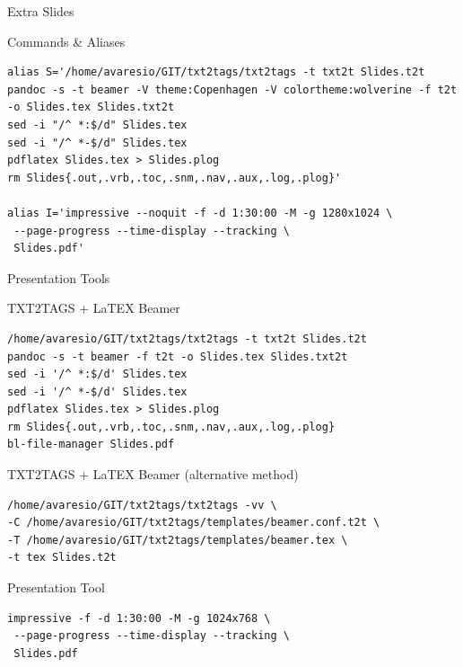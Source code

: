 \documentclass[ignorenonframetext,]{beamer}
\begin{document}
\begin{frame}[fragile]{Extra Slides}

\begin{block}{Commands \& Aliases}

\begin{verbatim}
alias S='/home/avaresio/GIT/txt2tags/txt2tags -t txt2t Slides.t2t
pandoc -s -t beamer -V theme:Copenhagen -V colortheme:wolverine -f t2t -o Slides.tex Slides.txt2t
sed -i "/^ *:$/d" Slides.tex
sed -i "/^ *-$/d" Slides.tex
pdflatex Slides.tex > Slides.plog
rm Slides{.out,.vrb,.toc,.snm,.nav,.aux,.log,.plog}'

alias I='impressive --noquit -f -d 1:30:00 -M -g 1280x1024 \
 --page-progress --time-display --tracking \
 Slides.pdf'
\end{verbatim}

\end{block}

\end{frame}

\begin{frame}[fragile]{Presentation Tools}

\begin{block}{TXT2TAGS + LaTEX Beamer}

\begin{verbatim}
/home/avaresio/GIT/txt2tags/txt2tags -t txt2t Slides.t2t
pandoc -s -t beamer -f t2t -o Slides.tex Slides.txt2t
sed -i '/^ *:$/d' Slides.tex
sed -i '/^ *-$/d' Slides.tex
pdflatex Slides.tex > Slides.plog
rm Slides{.out,.vrb,.toc,.snm,.nav,.aux,.log,.plog}
bl-file-manager Slides.pdf
\end{verbatim}

\end{block}

\begin{block}{TXT2TAGS + LaTEX Beamer (alternative method)}

\begin{verbatim}
/home/avaresio/GIT/txt2tags/txt2tags -vv \
-C /home/avaresio/GIT/txt2tags/templates/beamer.conf.t2t \
-T /home/avaresio/GIT/txt2tags/templates/beamer.tex \
-t tex Slides.t2t
\end{verbatim}

\end{block}

\begin{block}{Presentation Tool}

\begin{verbatim}
impressive -f -d 1:30:00 -M -g 1024x768 \
 --page-progress --time-display --tracking \
 Slides.pdf
\end{verbatim}

\end{block}

\end{frame}
\end{document}
